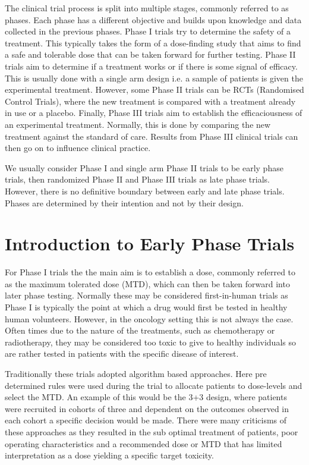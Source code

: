 The clinical trial process is split into multiple stages, commonly referred to as phases. Each phase has a different objective and builds upon knowledge and data collected in the previous phases. Phase I trials try to determine the safety of a treatment. This typically takes the form of a dose-finding study that aims to find a safe and tolerable dose that can be taken forward for further testing. Phase II trials aim to determine if a treatment works or if there is some signal of efficacy. This is usually done with a single arm design i.e. a sample of patients is given the experimental treatment. However, some Phase II trials can be RCTs (Randomised Control Trials), where the new treatment is compared with a treatment already in use or a placebo. Finally, Phase III trials aim to establish the efficaciousness of an experimental treatment. Normally, this is done by comparing the new treatment against the standard of care. Results from Phase III clinical trials can then go on to 
influence clinical practice.

We usually consider Phase I and single arm Phase II trials to be early phase trials, then randomized Phase II and Phase III trials as late phase trials. However, there is no definitive boundary between early and late phase trials. Phases are determined by their intention and not by their design.

\section{Introduction to Early Phase Trials}

For Phase \RN{1} trials the the main aim is to establish a dose, commonly referred to as the maximum tolerated dose (MTD), which can then be taken forward into later phase testing. Normally these may be considered first-in-human trials as Phase \RN{1} is typically the point at which a drug would first be tested in healthy human volunteers. However, in the oncology setting this is not always the case. Often times due to the nature of the treatments, such as chemotherapy or radiotherapy, they may be considered too toxic to give to healthy individuals so are rather tested in patients with the specific disease of interest. 

Traditionally these trials adopted algorithm based approaches. Here pre determined rules were used during the trial to allocate patients to dose-levels and select the MTD. An example of this would be the 3+3 design, where patients were recruited in cohorts of three and dependent on the outcomes observed in each cohort a specific decision would be made. There were many criticisms of these approaches as they resulted in the sub optimal treatment of patients, poor operating characteristics and a recommended dose or MTD that has limited interpretation as a dose yielding a specific target toxicity. 

